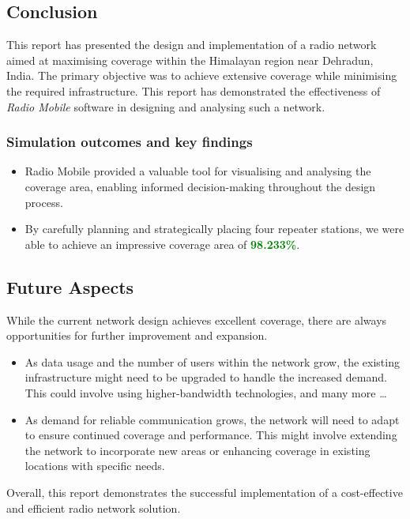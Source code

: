 \subsection{Conclusion}
This report has presented the design and implementation of a radio network aimed at maximising coverage within the Himalayan region near Dehradun, India.
The primary objective was to achieve extensive coverage while minimising the required infrastructure.
This report has demonstrated the effectiveness of \textit{Radio Mobile} software in designing and analysing such a network.

\subsubsection{Simulation outcomes and key findings}
\begin{itemize}
    \item Radio Mobile provided a valuable tool for visualising and analysing the coverage area, enabling informed decision-making throughout the design process.
    \item By carefully planning and strategically placing four repeater stations, we were able to achieve an impressive coverage area of \textcolor{Green}{\textbf{98.233\%}}.
\end{itemize}

\subsection{Future Aspects}
While the current network design achieves excellent coverage, there are always opportunities for further improvement and expansion.
\begin{itemize}
    \item As data usage and the number of users within the network grow, the existing infrastructure might need to be upgraded to handle the increased demand. 
    This could involve using higher-bandwidth technologies, and many more \ldots
    \item As demand for reliable communication grows, the network will need to adapt to ensure continued coverage and performance.
    This might involve extending the network to incorporate new areas or enhancing coverage in existing locations with specific needs.
\end{itemize}

Overall, this report demonstrates the successful implementation of a cost-effective and efficient radio network solution.